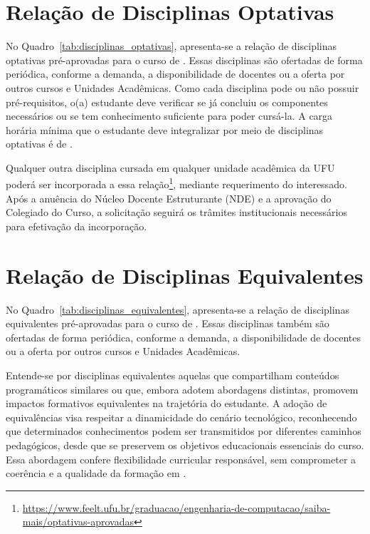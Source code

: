 
% 



\section{Relação de Disciplinas Optativas}
\label{sec:optativas}

No Quadro~\ref{tab:disciplinas_optativas}, apresenta-se a relação de disciplinas optativas pré-aprovadas para o curso de \nomecursonovo. Essas disciplinas são ofertadas de forma periódica, conforme a demanda, a disponibilidade de docentes ou a oferta por outros cursos e Unidades Acadêmicas. Como cada disciplina pode ou não possuir pré-requisitos, o(a) estudante deve verificar se já concluiu os componentes necessários ou se tem conhecimento suficiente para poder cursá-la. A carga horária mínima que o estudante deve integralizar por meio de disciplinas optativas é de \unskip.



Qualquer outra disciplina cursada em qualquer unidade acadêmica da UFU poderá ser incorporada a essa relação\footnote{\url{https://www.feelt.ufu.br/graduacao/engenharia-de-computacao/saiba-mais/optativas-aprovadas}}, mediante requerimento do interessado. Após a anuência do Núcleo Docente Estruturante (NDE) e a aprovação do Colegiado do Curso, a solicitação seguirá os trâmites institucionais necessários para efetivação da incorporação.


\section{Relação de Disciplinas Equivalentes}
\label{sec:equivalentes}

No Quadro~\ref{tab:disciplinas_equivalentes}, apresenta-se a relação de disciplinas equivalentes pré-aprovadas para o curso de \nomecursonovo. Essas disciplinas também são ofertadas de forma periódica, conforme a demanda, a disponibilidade de docentes ou a oferta por outros cursos e Unidades Acadêmicas.

Entende-se por disciplinas equivalentes aquelas que compartilham conteúdos programáticos similares ou que, embora adotem abordagens distintas, promovem impactos formativos equivalentes na trajetória do estudante. A adoção de equivalências visa respeitar a dinamicidade do cenário tecnológico, reconhecendo que determinados conhecimentos podem ser transmitidos por diferentes caminhos pedagógicos, desde que se preservem os objetivos educacionais essenciais do curso. Essa abordagem confere flexibilidade curricular responsável, sem comprometer a coerência e a qualidade da formação em \nomecursonovo.

